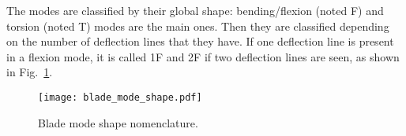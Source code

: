 The modes are classified by their global shape: 
bending/flexion (noted F) and torsion (noted T) 
modes are the main ones. Then they are classified
depending on the number of deflection lines that they
have. If one deflection line is present in a flexion 
mode, it is called 1F and 2F if two deflection lines are
seen, as shown in Fig.~\ref{fig:blade_mode_shape}.
\begin{figure}[htbp]
  \centering
  \texttt{[image: blade\_mode\_shape.pdf]}
  \caption{Blade mode shape nomenclature.}
  \label{fig:blade_mode_shape}
\end{figure}


